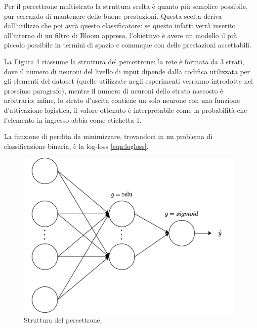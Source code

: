 \documentclass[../../main.tex]{subfiles}
\begin{document}
    Per il percettrone multistrato la struttura scelta è quanto più semplice possibile, pur cercando di mantenere delle buone prestazioni. Questa scelta deriva dall'utilizzo che poi avrà questo classificatore: se questo infatti verrà inserito all'interno di un filtro di Bloom appreso, l'obiettivo è avere un modello il più piccolo possibile in termini di spazio e comunque con delle prestazioni accettabili.

    La Figura \ref{fig:strutturaPercettrone} riassume la struttura del percettrone: la rete è formata da 3 strati, dove il numero di neuroni del livello di input dipende dalla codifica utilizzata per gli elementi del dataset (quelle utilizzate negli esperimenti verranno introdotte nel prossimo paragrafo), mentre il numero di neuroni dello strato nascosto è arbitrario; infine, lo strato d'uscita contiene un solo neurone con una funzione d'attivazione logistica, il valore ottenuto è interpretabile come la probabilità che l'elemento in ingresso abbia come etichetta 1.

    La funzione di perdita da minimizzare, trovandoci in un problema di classificazione binaria, è la log-loss \eqref{eqn:logloss}.

    \begin{figure}[H]
        \centering
        \includegraphics[width=\textwidth]{immagini/6_4/percettroneStruttura.drawio.png}
        \caption{Struttura del percettrone.}
        \label{fig:strutturaPercettrone}
    \end{figure}
\end{document}
